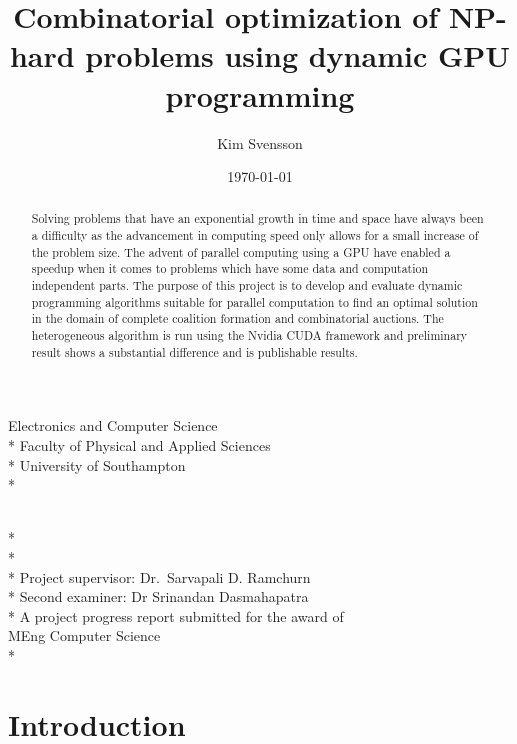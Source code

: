 \documentclass[a4paper, 12pt]{report}
\newcommand{\tdegree}{A project progress report submitted for the award of\\}
\newcommand{\degree}{\tdegree MEng Computer Science\\*}
\newcommand{\texam}{Second examiner: }
\newcommand{\exam}{\texam Dr Srinandan Dasmahapatra}
\newcommand{\tsupervisor}{Project supervisor: }
\newcommand{\supervisor}{\tsupervisor Dr.\ Sarvapali D. Ramchurn}
\newcommand{\school}{Electronics and Computer Science \\*
Faculty of Physical and Applied Sciences\\*
University of Southampton\\*}
\newenvironment{changemargin}[2]{%
\begin{list}{}{%
\setlength{\topsep}{0pt}%
\setlength{\leftmargin}{#1}%
\setlength{\rightmargin}{#2}%
\setlength{\listparindent}{\parindent}%
\setlength{\itemindent}{\parindent}%
\setlength{\parsep}{\parskip}%
}%
\item[]}{\end{list}}
\begin{document}
\author{Kim Svensson}
\date{\today}
\title{Combinatorial optimization of NP-hard problems using dynamic GPU programming}

\makeatletter
\begin{titlepage}
\begin{changemargin}{-2cm}{-2cm}
\begin{center}
\LARGE\school %

\LARGE
\vfill
\@author \\*
\@date \\*
\doublespacing
\@title \\*
\vfill
\singlespacing
\supervisor \\*
\exam \\*
\vfill
\degree
\end{center} 
\end{changemargin}
\end{titlepage}
\makeatother

\begin{abstract}
Solving problems that have an exponential growth in time and space have always been a difficulty as the advancement in computing speed only allows for a small increase of the problem size. The advent of parallel computing using a GPU have enabled a speedup when it comes to problems which have some data and computation independent parts.
The purpose of this project is to develop and evaluate dynamic programming algorithms suitable for parallel computation to find an optimal solution in the domain of complete coalition formation and combinatorial auctions. The heterogeneous algorithm is run using the Nvidia CUDA framework and preliminary result shows a substantial difference and is publishable results.

\end{abstract}
\tableofcontents
\newpage
\section{Introduction}
\end{document}
